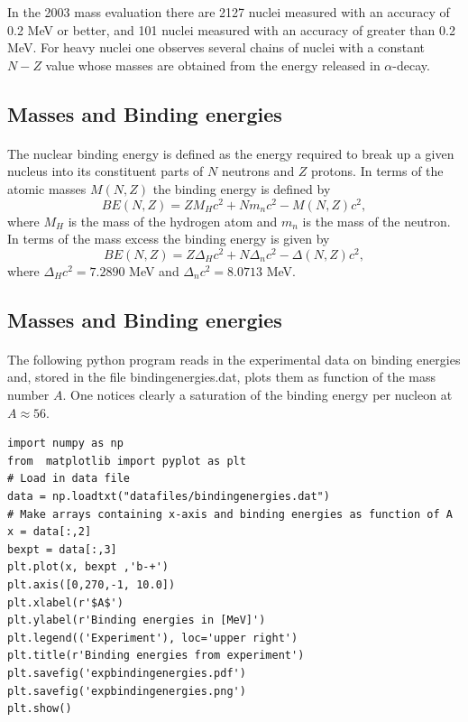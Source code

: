 \documentclass[%
twoside,                 %
final,                   %
10pt]{article}
\begin{document}
In the 2003 mass evaluation there are 2127 nuclei measured with an accuracy of 0.2
MeV or better, and 101 nuclei measured with an accuracy of greater than 0.2 MeV. For
heavy nuclei one observes several chains of nuclei with a constant $N-Z$ value whose masses are obtained from the energy released in $\alpha$-decay.




\subsection*{Masses and Binding energies}

\paragraph{}
The nuclear binding energy is defined as the energy required to break up a given nucleus
into its constituent parts of $N$ neutrons and $Z$ protons. In terms of the atomic masses $M(N, Z)$ the binding energy is defined by
\[
BE(N, Z) = ZM_H c^2 + Nm_n c^2 - M(N, Z)c^2 ,
\]
where $M_H$ is the mass of the hydrogen atom and $m_n$ is the mass of the neutron.
In terms of the mass excess the binding energy is given by
\[
BE(N, Z) = Z\Delta_H c^2 + N\Delta_n c^2 -\Delta(N, Z)c^2 ,
\]
where $\Delta_H c^2 = 7.2890$ MeV and $\Delta_n c^2 = 8.0713$ MeV.



\subsection*{Masses and Binding energies}

\paragraph{}
The following python program reads in the experimental data on binding energies and, stored in the file bindingenergies.dat,  plots them as function of the mass number $A$. One notices clearly a saturation of the binding energy per nucleon at $A\approx 56$.
\begin{verbatim}
import numpy as np
from  matplotlib import pyplot as plt
# Load in data file
data = np.loadtxt("datafiles/bindingenergies.dat")
# Make arrays containing x-axis and binding energies as function of A
x = data[:,2]
bexpt = data[:,3]
plt.plot(x, bexpt ,'b-+')
plt.axis([0,270,-1, 10.0])
plt.xlabel(r'$A$')
plt.ylabel(r'Binding energies in [MeV]')
plt.legend(('Experiment'), loc='upper right')
plt.title(r'Binding energies from experiment')
plt.savefig('expbindingenergies.pdf')
plt.savefig('expbindingenergies.png')
plt.show()
\end{verbatim}
\end{document}
